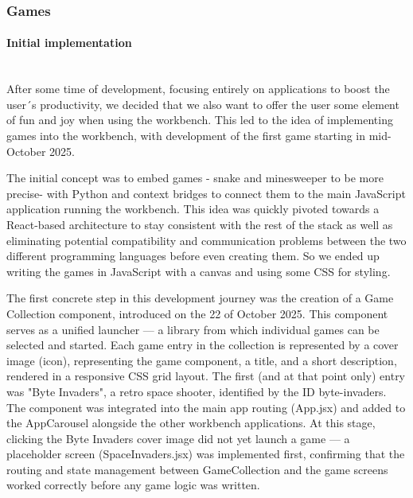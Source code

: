\documentclass[a4paper,12pt]{article}
\begin{document}
\newpage
\subsubsection{Games}
\paragraph{Initial implementation}\mbox{} \\
After some time of development, focusing entirely on applications to boost the user´s productivity, we decided that we also want to offer the user some element of fun and joy when using the workbench. 
This led to the idea of implementing games into the workbench, with development of the first game starting in mid- October 2025. 

The initial concept was to embed games - snake and minesweeper to be more precise- with Python and context bridges to connect them to the main JavaScript application running the workbench. 
This idea was quickly pivoted towards a React-based architecture to stay consistent with the rest of the stack as well as eliminating potential compatibility and communication problems between the two different programming languages before even creating them. 
So we ended up writing the games in JavaScript with a canvas and using some CSS for styling.

The first concrete step in this development journey was the creation of a Game Collection component, introduced on the 22 of October 2025. 
This component serves as a unified launcher — a library from which individual games can be selected and started. 
Each game entry in the collection is represented by a cover image (icon), representing the game component, a title, and a short description, rendered in a responsive CSS grid layout. The first (and at that point only) entry was "Byte Invaders", a retro space shooter, identified by the ID byte-invaders. The component was integrated into the main app routing (App.jsx) and added to the AppCarousel alongside the other workbench applications.
At this stage, clicking the Byte Invaders cover image did not yet launch a game — a placeholder screen (SpaceInvaders.jsx) was implemented first, confirming that the routing and state management between GameCollection and the game screens worked correctly before any game logic was written.

\newpage
\end{document}
